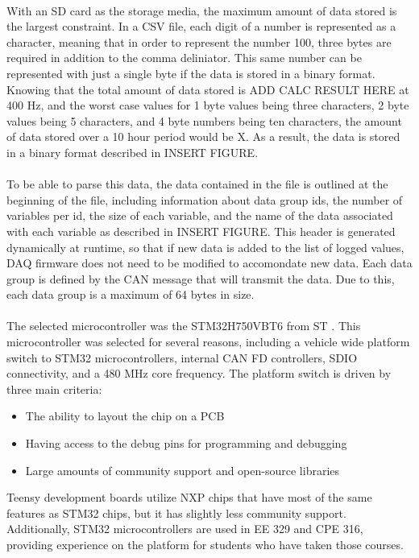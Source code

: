 \paragraph{}
With an SD card as the storage media, the maximum amount of data stored is the largest constraint.
In a CSV file, each digit of a number is represented as a character, meaning that in order to represent the number 100, three bytes are required in addition to the comma deliniator.
This same number can be represented with just a single byte if the data is stored in a binary format.
Knowing that the total amount of data stored is ADD CALC RESULT HERE at 400 Hz, and the worst case values for 1 byte values being three characters, 2 byte values being 5 characters, and 4 byte numbers being ten characters, the amount of data stored over a 10 hour period would be X.
As a result, the data is stored in a binary format described in INSERT FIGURE.

\paragraph{}
To be able to parse this data, the data contained in the file is outlined at the beginning of the file, including information about data group ids, the number of variables per id, the size of each variable, and the name of the data associated with each variable as described in INSERT FIGURE.
This header is generated dynamically at runtime, so that if new data is added to the list of logged values, DAQ firmware does not need to be modified to accomondate new data.
Each data group is defined by the CAN message that will transmit the data.
Due to this, each data group is a maximum of 64 bytes in size.

\paragraph{}
The selected microcontroller was the STM32H750VBT6 from ST \cite{STMProductPage}.
This microcontroller was selected for several reasons, including a vehicle wide platform switch to STM32 microcontrollers, internal CAN FD controllers, SDIO connectivity, and a 480 MHz core frequency.
The platform switch is driven by three main criteria:
\begin{itemize}
	\item The ability to layout the chip on a PCB
	\item Having access to the debug pins for programming and debugging
	\item Large amounts of community support and open-source libraries
\end{itemize}
Teensy development boards utilize NXP chips that have most of the same features as STM32 chips, but it has slightly less community support.
Additionally, STM32 microcontrollers are used in EE 329 and CPE 316, providing experience on the platform for students who have taken those courses.

